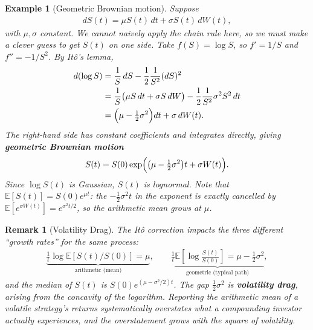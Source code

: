 \documentclass{report}
\theoremstyle{spacedplain}
\theoremstyle{spaceddefinition}
\newtheorem{example}[theorem]{Example}
\theoremstyle{spacedremark}
\newtheorem{remark}[theorem]{Remark}
\begin{document}
\begin{example}[Geometric Brownian motion]
Suppose
\begin{align}
    dS(t) = \mu S(t)\, dt + \sigma S(t)\, dW(t),
\end{align}
with $\mu,\sigma$ constant. We cannot naively apply the chain rule here, so we must make a clever guess to get $S(t)$ on one side. Take $f(S) = \log S$, so $f' = 1/S$ and $f'' = -1/S^2$. By It\^o's lemma,
\begin{align}
    d(\log S) &= \frac{1}{S}\, dS - \frac{1}{2}\frac{1}{S^2}(dS)^2 \\
    &= \frac{1}{S}\bigl(\mu S\, dt + \sigma S\, dW\bigr) - \frac{1}{2}\frac{1}{S^2}\sigma^2 S^2\, dt \\
    &= \Bigl(\mu - \tfrac{1}{2}\sigma^2\Bigr) dt + \sigma\, dW(t).
\end{align}
The right-hand side has constant coefficients and integrates directly, giving \textbf{geometric Brownian motion}
\begin{align}
    S(t) = S(0)\exp\Bigl(\bigl(\mu - \tfrac{1}{2}\sigma^2\bigr)t + \sigma W(t)\Bigr).
\end{align}
Since $\log S(t)$ is Gaussian, $S(t)$ is lognormal. Note that $\mathbb{E}[S(t)] = S(0)e^{\mu t}$: the $-\tfrac12\sigma^2 t$ in the exponent is exactly cancelled by $\mathbb{E}[e^{\sigma W(t)}] = e^{\sigma^2 t/2}$, so the arithmetic mean grows at $\mu$.
\end{example}

\begin{remark}[Volatility Drag]\label{rmk:vol-drag}
The It\^o correction impacts the three different ``growth rates'' for the same process:
\begin{align}
    \underbrace{\frac{1}{t}\log\mathbb{E}[S(t)/S(0)] = \mu}_{\text{arithmetic (mean)}},
    \qquad
    \underbrace{\frac{1}{t}\mathbb{E}\!\left[\log\frac{S(t)}{S(0)}\right] = \mu - \tfrac12\sigma^2}_{\text{geometric (typical path)}},
\end{align}
and the median of $S(t)$ is $S(0)e^{(\mu-\sigma^2/2)t}$. The gap $\tfrac12\sigma^2$ is \textbf{volatility drag}, arising from the concavity of the logarithm. Reporting the arithmetic mean of a volatile strategy's returns systematically overstates what a compounding investor actually experiences, and the overstatement grows with the square of volatility.
\end{remark}
\end{document}
